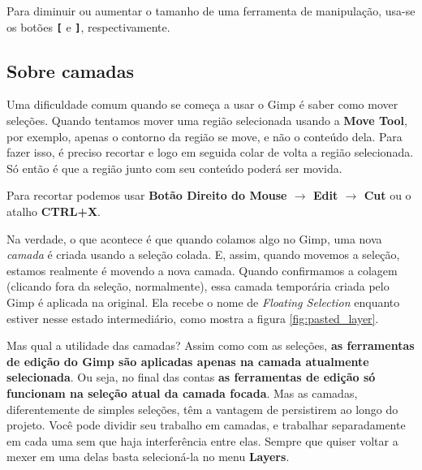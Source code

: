 \documentclass[12pt,onecolumn]{article}
\begin{document}
    \begin{framed}
      Para diminuir ou aumentar o tamanho de uma ferramenta de manipulação,
      usa-se os botões {\bf \verb$[$} e {\bf \verb$]$}, respectivamente.
    \end{framed}
        
  \subsection{Sobre camadas}
    
    Uma dificuldade comum quando se começa a usar o Gimp é saber como mover
    seleções. Quando tentamos mover uma região selecionada usando a {\bf Move
    Tool}, por exemplo, apenas o contorno da região se move, e não o conteúdo
    dela. Para fazer isso, é preciso recortar e logo em seguida colar de volta a
    região selecionada. Só então é que a região junto com seu conteúdo poderá
    ser movida.
    
    \begin{framed}
      Para recortar podemos usar {\bf Botão Direito do Mouse $\rightarrow$ Edit
      $\rightarrow$ Cut} ou o atalho {\bf CTRL+X}.
    \end{framed}
    
    Na verdade, o que acontece é que quando colamos algo no Gimp, uma nova {\it
    camada} é criada usando a seleção colada. E, assim, quando movemos a
    seleção, estamos realmente é movendo a nova camada. Quando confirmamos a
    colagem (clicando fora da seleção, normalmente), essa camada temporária
    criada pelo Gimp é aplicada na original. Ela recebe o nome de {\it Floating
    Selection} enquanto estiver nesse estado intermediário, como mostra a figura
    \ref{fig:pasted_layer}.
    
    Mas qual a utilidade das camadas? Assim como com as seleções, {\bf as
    ferramentas de edição do Gimp são aplicadas apenas na camada atualmente
    selecionada}. Ou seja, no final das contas {\bf as ferramentas de edição só
    funcionam na seleção atual da camada focada}. Mas as camadas, diferentemente
    de simples seleções, têm a vantagem de persistirem ao longo do projeto. Você
    pode dividir seu trabalho em camadas, e trabalhar separadamente em cada uma
    sem que haja interferência entre elas. Sempre que quiser voltar a mexer em
    uma delas basta selecioná-la no menu {\bf Layers}.
    
\end{document}
